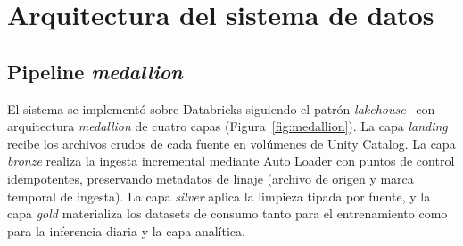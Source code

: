 \documentclass[11pt,a4paper]{article}
\begin{document}
\section{Arquitectura del sistema de datos}
\label{sec:arquitectura}

\subsection{Pipeline \emph{medallion}}

El sistema se implementó sobre Databricks siguiendo el patrón
\emph{lakehouse}~\cite{armbrust2021} con arquitectura \emph{medallion} de
cuatro capas (Figura~\ref{fig:medallion}). La capa \emph{landing} recibe los
archivos crudos de cada fuente en volúmenes de Unity Catalog. La capa
\emph{bronze} realiza la ingesta incremental mediante Auto Loader con
puntos de control idempotentes, preservando metadatos de linaje (archivo de
origen y marca temporal de ingesta). La capa \emph{silver} aplica la
limpieza tipada por fuente, y la capa \emph{gold} materializa los datasets
de consumo tanto para el entrenamiento como para la inferencia diaria y la
capa analítica.
\end{document}
